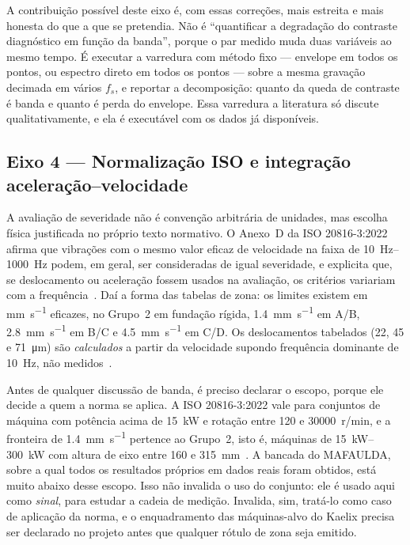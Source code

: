 \documentclass[11pt,a4paper]{article}
\begin{document}
A contribuição possível deste eixo é, com essas correções, mais estreita e mais honesta do
que a que se pretendia. Não é ``quantificar a degradação do contraste diagnóstico em
função da banda'', porque o par medido muda duas variáveis ao mesmo tempo. É executar a
varredura com método fixo --- envelope em todos os pontos, ou espectro direto em todos os
pontos --- sobre a mesma gravação decimada em vários $f_s$, e reportar a decomposição:
quanto da queda de contraste é banda e quanto é perda do envelope. Essa varredura a
literatura só discute qualitativamente, e ela é executável com os dados já disponíveis.

\subsection{Eixo 4 --- Normalização ISO e integração aceleração--velocidade}

A avaliação de severidade não é convenção arbitrária de unidades, mas escolha física
justificada no próprio texto normativo. O Anexo~D da ISO 20816-3:2022 afirma que vibrações
com o mesmo valor eficaz de velocidade na faixa de \SIrange{10}{1000}{\hertz} podem, em
geral, ser consideradas de igual severidade, e explicita que, se deslocamento ou
aceleração fossem usados na avaliação, os critérios variariam com a
frequência~\cite{iso208163_2022}. Daí a forma das tabelas de zona: os limites existem em
\si{\milli\meter\per\second} eficazes, no Grupo~2 em fundação rígida,
\SI{1,4}{\milli\meter\per\second} em A/B, \SI{2,8}{\milli\meter\per\second} em B/C e
\SI{4,5}{\milli\meter\per\second} em C/D. Os deslocamentos tabelados (\num{22}, \num{45} e
\SI{71}{\micro\meter}) são \emph{calculados} a partir da velocidade supondo frequência
dominante de \SI{10}{\hertz}, não medidos~\cite{iso208163_2022}.

Antes de qualquer discussão de banda, é preciso declarar o escopo, porque ele decide a
quem a norma se aplica. A ISO 20816-3:2022 vale para conjuntos de máquina com potência
acima de \SI{15}{\kilo\watt} e rotação entre \num{120} e \num{30000}~r/min, e a fronteira
de \SI{1,4}{\milli\meter\per\second} pertence ao Grupo~2, isto é, máquinas de
\SIrange{15}{300}{\kilo\watt} com altura de eixo entre \num{160} e
\SI{315}{\milli\meter}~\cite{iso208163_2022}. A bancada do MAFAULDA, sobre a qual todos os
resultados próprios em dados reais foram obtidos, está muito abaixo desse escopo. Isso não
invalida o uso do conjunto: ele é usado aqui como \emph{sinal}, para estudar a cadeia de
medição. Invalida, sim, tratá-lo como caso de aplicação da norma, e o enquadramento das
máquinas-alvo do Kaelix precisa ser declarado no projeto antes que qualquer rótulo de zona
seja emitido.
\end{document}
